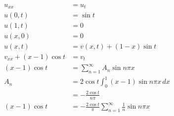 \documentclass{article}
\begin{document}
\begin{align*}
  u_{x x}                                                        & = u_t                                                                                                                                              \\
  u(0, t)                                                        & = \sin t                                                                                                                                           \\
  u(1, t)                                                        & = 0                                                                                                                                                \\
  u(x, 0)                                                        & = 0                                                                                                                                                \\
  u(x, t)                                                        & = v(x, t) + (1 - x) \sin t                                                                                                                         \\
  v_{x x} + (x - 1) \cos t                                       & = v_t                                                                                                                                              \\
  (x - 1) \cos t                                                 & = \sum_{n = 1}^\infty A_n \sin n \pi x                                                                                                             \\
  A_n                                                            & = 2 \cos t \int_0^1 (x - 1) \sin n \pi x \,d x                                                                                                     \\
                                                                 & = -\frac{2 \cos t}{n \pi}                                                                                                                          \\
  (x - 1) \cos t                                                 & = -\frac{2 \cos t}{\pi} \sum_{n = 1}^\infty \frac{1}{n} \sin n \pi x                                                                               \\

\end{align*}
\end{document}

